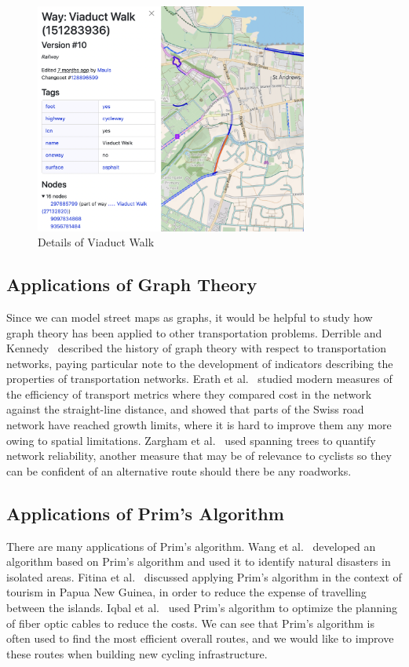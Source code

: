 \documentclass[12pt,a4paper]{report}
\begin{document}
\begin{figure}[ht]
\centering
\includegraphics[width=0.8\textwidth]{plan_images/cycleway.png}
\caption{Details of Viaduct Walk}
\label{fig:cycleway_query}
\end{figure}

\subsection*{Applications of Graph Theory}
Since we can model street maps as graphs, it would be helpful to study how graph theory has been applied to other transportation problems. Derrible and Kennedy~\cite{derrible2011} described the history of graph theory with respect to transportation networks, paying particular note to the development of indicators describing the properties of transportation networks. Erath et al.~\cite{erath2009} studied modern measures of the efficiency of transport metrics where they compared cost in the network against the straight-line distance, and showed that parts of the Swiss road network have reached growth limits, where it is hard to improve them any more owing to spatial limitations. Zargham et al.~\cite{zarghami2020} used spanning trees to quantify network reliability, another measure that may be of relevance to cyclists so they can be confident of an alternative route should there be any roadworks.

\subsection*{Applications of Prim's Algorithm}
There are many applications of Prim's algorithm. Wang et al.~\cite{wang2018} developed an algorithm based on Prim's algorithm and used it to identify natural disasters in isolated areas. Fitina et al.~\cite{fitina} discussed applying Prim's algorithm in the context of tourism in Papua New Guinea, in order to reduce the expense of travelling between the islands. Iqbal et al.~\cite{iqbal2017} used Prim's algorithm to optimize the planning of fiber optic cables to reduce the costs. We can see that Prim's algorithm is often used to find the most efficient overall routes, and we would like to improve these routes when building new cycling infrastructure. 
\end{document}
